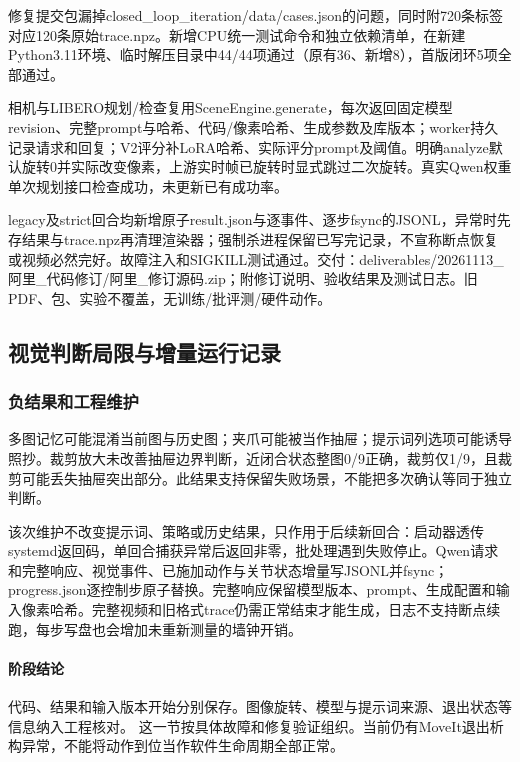 修复提交包漏掉closed\_loop\_iteration/data/cases.json的问题，同时附720条标签对应120条原始trace.npz。新增CPU统一测试命令和独立依赖清单，在新建Python3.11环境、临时解压目录中44/44项通过（原有36、新增8），首版闭环5项全部通过。

相机与LIBERO规划/检查复用SceneEngine.generate，每次返回固定模型revision、完整prompt与哈希、代码/像素哈希、生成参数及库版本；worker持久记录请求和回复；V2评分补LoRA哈希、实际评分prompt及阈值。明确analyze默认旋转0并实际改变像素，上游实时帧已旋转时显式跳过二次旋转。真实Qwen权重单次规划接口检查成功，未更新已有成功率。

legacy及strict回合均新增原子result.json与逐事件、逐步fsync的JSONL，异常时先存结果与trace.npz再清理渲染器；强制杀进程保留已写完记录，不宣称断点恢复或视频必然完好。故障注入和SIGKILL测试通过。交付：deliverables/20261113\_阿里\_代码修订/阿里\_修订源码.zip；附修订说明、验收结果及测试日志。旧PDF、包、实验不覆盖，无训练/批评测/硬件动作。


\subsection{视觉判断局限与增量运行记录}\label{s18-detail-9}

\subsubsection{负结果和工程维护}\label{s18-detail-10}

多图记忆可能混淆当前图与历史图；夹爪可能被当作抽屉；提示词列选项可能诱导照抄。裁剪放大未改善抽屉边界判断，近闭合状态整图0/9正确，裁剪仅1/9，且裁剪可能丢失抽屉突出部分。此结果支持保留失败场景，不能把多次确认等同于独立判断。

该次维护不改变提示词、策略或历史结果，只作用于后续新回合：启动器透传systemd返回码，单回合捕获异常后返回非零，批处理遇到失败停止。Qwen请求和完整响应、视觉事件、已施加动作与关节状态增量写JSONL并fsync；progress.json逐控制步原子替换。完整响应保留模型版本、prompt、生成配置和输入像素哈希。完整视频和旧格式trace仍需正常结束才能生成，日志不支持断点续跑，每步写盘也会增加未重新测量的墙钟开销。


\paragraph{阶段结论}代码、结果和输入版本开始分别保存。图像旋转、模型与提示词来源、退出状态等信息纳入工程核对。 这一节按具体故障和修复验证组织。当前仍有MoveIt退出析构异常，不能将动作到位当作软件生命周期全部正常。

